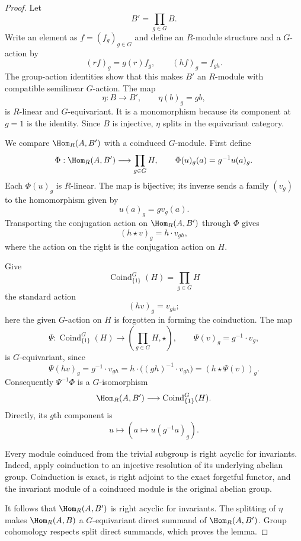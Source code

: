 \begin{proof}
Let
$$
B'=\prod_{g\in G}B.
$$
Write an element as $f=(f_g)_{g\in G}$ and define an $R$-module structure
and a $G$-action by
$$
(r f)_g=g(r)f_g,
\qquad
(h f)_g=f_{gh}.
$$
The group-action identities show that this makes $B'$ an $R$-module with
compatible semilinear $G$-action. The map
$$
\eta:B\longrightarrow B',
\qquad
\eta(b)_g=gb,
$$
is $R$-linear and $G$-equivariant. It is a monomorphism because its
component at $g=1$ is the identity. Since $B$ is injective, $\eta$ splits
in the equivariant category.

We compare $\Hom_R(A,B')$ with a coinduced $G$-module. First define
$$
\Phi:\Hom_R(A,B')\longrightarrow\prod_{g\in G}H,
\qquad
\Phi(u)_g(a)=g^{-1}u(a)_g.
$$
Each $\Phi(u)_g$ is $R$-linear. The map is bijective; its inverse sends a
family $(v_g)$ to the homomorphism given by
$$
u(a)_g=gv_g(a).
$$
Transporting the conjugation action on $\Hom_R(A,B')$ through $\Phi$
gives
$$
(h\star v)_g=h\cdot v_{gh},
$$
where the action on the right is the conjugation action on $H$.

Give
$$
\operatorname{Coind}_{\{1\}}^G(H)=\prod_{g\in G}H
$$
the standard action
$$
(hv)_g=v_{gh};
$$
here the given $G$-action on $H$ is forgotten in forming the coinduction.
The map
$$
\Psi:
\operatorname{Coind}_{\{1\}}^G(H)
\longrightarrow
\left(\prod_{g\in G}H,\star\right),
\qquad
\Psi(v)_g=g^{-1}\cdot v_g,
$$
is $G$-equivariant, since
$$
\Psi(hv)_g
=g^{-1}\cdot v_{gh}
=h\cdot\bigl((gh)^{-1}\cdot v_{gh}\bigr)
=(h\star\Psi(v))_g.
$$
Consequently $\Psi^{-1}\Phi$ is a $G$-isomorphism
$$
\Hom_R(A,B')
\longrightarrow
\operatorname{Coind}_{\{1\}}^G(H).
$$
Directly, its $g$th component is
$$
u\longmapsto\left(a\longmapsto u(g^{-1}a)_g\right).
$$

Every module coinduced from the trivial subgroup is right acyclic for
invariants. Indeed, apply coinduction to an injective resolution of its
underlying abelian group. Coinduction is exact, is right adjoint to the
exact forgetful functor, and the invariant module of a coinduced module is
the original abelian group.

It follows that $\Hom_R(A,B')$ is right acyclic for invariants. The
splitting of $\eta$ makes $\Hom_R(A,B)$ a $G$-equivariant direct summand
of $\Hom_R(A,B')$. Group cohomology respects split direct summands, which
proves the lemma.
\end{proof}



